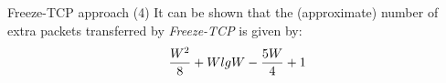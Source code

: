 \begin{frame}{Freeze-TCP approach (4)}
        It can be shown that the (approximate) number
	of extra packets transferred by \textit{Freeze-TCP} is given by:
	$$
		{{W^2 \over 8} + {WlgW} - {5W \over 4} + 1}
	$$
\end{frame}
